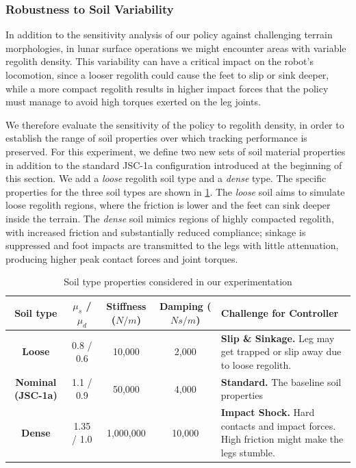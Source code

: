 \subsubsection{Robustness to Soil Variability} \label{exp:soil}

In addition to the sensitivity analysis of our policy against challenging terrain morphologies, in lunar surface operations we might encounter areas with variable regolith density. This variability can have a critical impact on the robot's locomotion, since a looser regolith could cause the feet to slip or sink deeper, while a more compact regolith results in higher impact forces that the policy must manage to avoid high torques exerted on the leg joints. 

We therefore evaluate the sensitivity of the policy to regolith density, in order to establish the range of soil properties over which tracking performance is preserved. For this experiment, we define two new sets of soil material properties in addition to the standard JSC-1a configuration introduced at the beginning of this section. We add a \textit{loose} regolith soil type and a \textit{dense} type. The specific properties for the three soil types are shown in \cref{tab:soil_properties}. The \textit{loose} soil aims to simulate loose regolith regions, where the friction is lower and the feet can sink deeper inside the terrain. The \textit{dense} soil mimics regions of highly compacted regolith, with increased friction and substantially reduced compliance; sinkage is suppressed and foot impacts are transmitted to the legs with little attenuation, producing higher peak contact forces and joint torques.

\begin{table}[width=\textwidth,cols=5]
    \caption{Soil type properties considered in our experimentation}
    \label{tab:soil_properties}
    \renewcommand{\arraystretch}{1.5} %
    \begin{tabular}{c c c c p{6cm}}
        \toprule
        \textbf{Soil type} & \textbf{$\mu_s$ / $\mu_d$} & \textbf{Stiffness ($N/m$)} & \textbf{Damping ($Ns/m$)} & \textbf{Challenge for Controller} \\
        \midrule
        \textbf{Loose} & 0.8 / 0.6 & 10,000 & 2,000 & \textbf{Slip \& Sinkage.} Leg may get trapped or slip away due to loose regolith. \\
        [1ex] %
        \textbf{Nominal (JSC-1a)} & 1.1 / 0.9 & 50,000 & 4,000 & \textbf{Standard.} The baseline soil properties \\
        [1ex]
        \textbf{Dense} & 1.35 / 1.0 & 1,000,000 & 10,000 & \textbf{Impact Shock.} Hard contacts and impact forces. High friction might make the legs stumble. \\
        \bottomrule
    \end{tabular}
\end{table}


